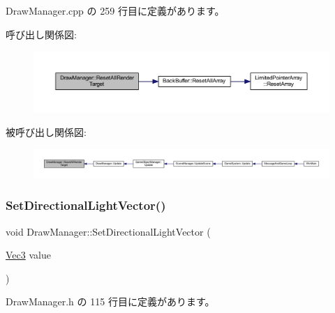  Draw\+Manager.\+cpp の 259 行目に定義があります。

呼び出し関係図\+:
\nopagebreak
\begin{figure}[H]
\begin{center}
\leavevmode
\includegraphics[width=350pt]{class_draw_manager_a20787acc9c5a096e80651dc1909ae60d_cgraph}
\end{center}
\end{figure}
被呼び出し関係図\+:
\nopagebreak
\begin{figure}[H]
\begin{center}
\leavevmode
\includegraphics[width=350pt]{class_draw_manager_a20787acc9c5a096e80651dc1909ae60d_icgraph}
\end{center}
\end{figure}
\mbox{\label{class_draw_manager_a470edae8248d36956a02bab7e59a4140}} 
\subsubsection{\texorpdfstring{Set\+Directional\+Light\+Vector()}{SetDirectionalLightVector()}}
{\footnotesize\ttfamily void Draw\+Manager\+::\+Set\+Directional\+Light\+Vector (\begin{DoxyParamCaption}\item[{\mbox{\hyperlink{_vector3_d_8h_ab16f59e4393f29a01ec8b9bbbabbe65d}{Vec3}}}]{value }\end{DoxyParamCaption})\hspace{0.3cm}{\ttfamily [inline]}}



 Draw\+Manager.\+h の 115 行目に定義があります。

\mbox{\label{class_draw_manager_ae58095d9d734f30211011e9205aa57aa}} 

